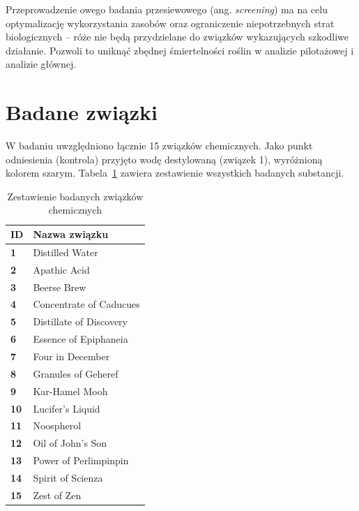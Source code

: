\documentclass[12pt, a4paper]{article}
\begin{document}
Przeprowadzenie owego badania przesiewowego (ang. \textit{screening}) ma na celu optymalizację wykorzystania zasobów oraz ograniczenie niepotrzebnych strat biologicznych
-- róże nie będą przydzielane do związków wykazujących szkodliwe działanie. Pozwoli to uniknąć zbędnej śmiertelności roślin w analizie pilotażowej i analizie głównej.

\section{Badane związki}

W badaniu uwzględniono łącznie 15 związków chemicznych. Jako punkt odniesienia (kontrola)
przyjęto wodę destylowaną (związek 1), wyróżnioną kolorem szarym. Tabela~\ref{tab:zwiazki} zawiera zestawienie wszystkich
badanych substancji.

\vspace{0.5em}
\begin{table}[ht]
\centering
\caption{Zestawienie badanych związków chemicznych}
\label{tab:zwiazki}
\renewcommand{\arraystretch}{1.3}
\begin{tabularx}{\textwidth}{>{\centering\bfseries}p{1.5cm} >{\centering\arraybackslash}X}
\toprule
\textbf{ID} & \textbf{Nazwa związku} \\
\midrule
\rowcolor{lightgray}
1  & Distilled Water           \\
2  & Apathic Acid              \\
3  & Beerse Brew               \\
4  & Concentrate of Caducues   \\
5  & Distillate of Discovery   \\
6  & Essence of Epiphaneia     \\
7  & Four in December          \\
8  & Granules of Geheref       \\
9  & Kar-Hamel Mooh            \\
10 & Lucifer's Liquid          \\
11 & Noospherol                \\
12 & Oil of John's Son         \\
13 & Power of Perlimpinpin     \\
14 & Spirit of Scienza         \\
15 & Zest of Zen               \\
\bottomrule
\end{tabularx}
\end{table}
\end{document}
